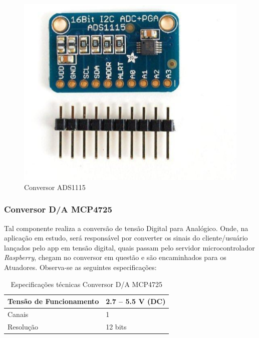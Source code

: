 \begin{figure}[h]
	\centering
	\includegraphics[keepaspectratio=true,scale=0.3]{figuras/sensor3.eps}
	\caption{Conversor ADS1115}
	\label{sensor3}
\end{figure}

\subsubsection{Conversor D/A MCP4725}

Tal componente realiza a conversão de tensão Digital para Analógico. Onde, na aplicação em estudo, será responsável por converter os sinais do cliente/usuário lançados pelo app em tensão digital, quais passam pelo servidor  microcontrolador \textit{Raspberry}, chegam no conversor em questão e são encaminhados para os Atuadores. Observa-se as seguintes especificações:

\begin{table}[h]
\centering
\caption{Especificações técnicas Conversor D/A MCP4725}
\label{table5}
\begin{tabular}{|l|l|}
\hline
Tensão de Funcionamento & 2.7 – 5.5 V (DC) \\ \hline
Canais                  & 1                \\ \hline
Resolução               & 12 bits          \\ \hline
\end{tabular}
\end{table}


